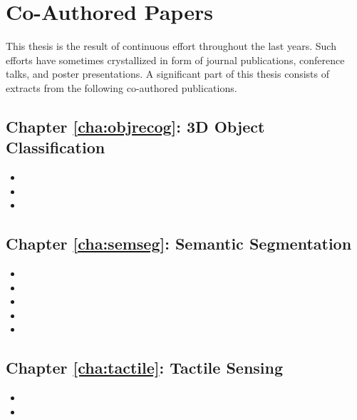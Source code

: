 \section{Co-Authored Papers}
\label{cha:introduction:sec:papers}

This thesis is the result of continuous effort throughout the last years. Such efforts have sometimes crystallized in form of journal publications, conference talks, and poster presentations. A significant part of this thesis consists of extracts from the following co-authored publications.

\subsection{Chapter \ref{cha:objrecog}: 3D Object Classification}

\begin{itemize}
  \item {}
  \item {}
  \item {}
\end{itemize}

\subsection{Chapter \ref{cha:semseg}: Semantic Segmentation}

\begin{itemize}
  \item {}
  \item {}
  \item {}
  \item {}
  \item {}
\end{itemize}

\subsection{Chapter \ref{cha:tactile}: Tactile Sensing}

\begin{itemize}
  \item {}
  \item {}
\end{itemize}

